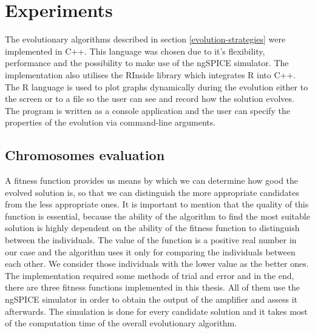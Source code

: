\chapter{Experiments}
The evolutionary algorithms described in section \ref{evolution-strategies} were implemented in C++. This language was chosen due to it's flexibility, performance and the possibility to make use of the ngSPICE simulator. The implementation also utilises the RInside library which integrates R into C++. The R language is used to plot graphs dynamically during the evolution either to the screen or to a file so the user can see and record how the solution evolves.\\
The program is written as a console application and the user can specify the properties of the evolution via command-line arguments.

\section{Chromosomes evaluation} \label{chromosomes-evaluation}
A fitness function provides us means by which we can determine how good the evolved solution is, so that we can distinguish the more appropriate candidates from the less appropriate ones. It is important to mention that the quality of this function is essential, because the ability of the algorithm to find the most suitable solution is highly dependent on the ability of the fitness function to distinguish between the individuals. The value of the function is a positive real number in our case and the algorithm uses it only for comparing the individuals between each other. We consider those individuals with the lower value as the better ones.\\
The implementation required some methods of trial and error and in the end, there are three fitness functions implemented in this thesis. All of them use the ngSPICE simulator in order to obtain the output of the amplifier and assess it afterwards. The simulation is done for every candidate solution and it takes most of the computation time of the overall evolutionary algorithm.

